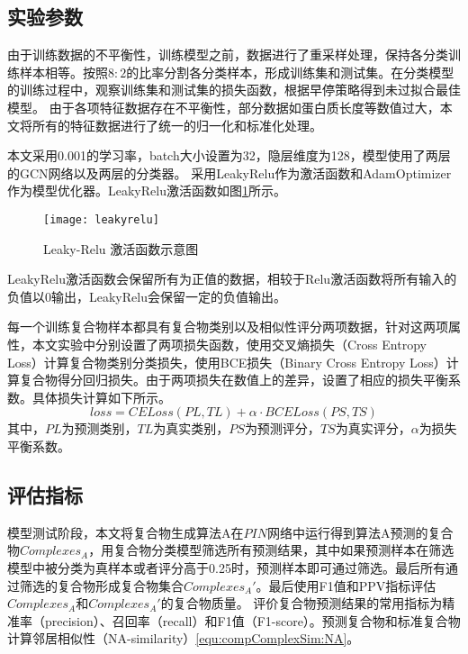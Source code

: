 \subsection{实验参数}
\label{subsection:allExperienceDesign:nums}

由于训练数据的不平衡性，训练模型之前，数据进行了重采样处理，保持各分类训练样本相等。按照$8:2$的比率分割各分类样本，形成训练集和测试集。在分类模型的训练过程中，观察训练集和测试集的损失函数，根据早停策略得到未过拟合最佳模型。
由于各项特征数据存在不平衡性，部分数据如蛋白质长度等数值过大，本文将所有的特征数据进行了统一的归一化和标准化处理。

本文采用0.001的学习率，batch大小设置为32，隐层维度为128，模型使用了两层的GCN网络以及两层的分类器。
采用LeakyRelu作为激活函数和AdamOptimizer作为模型优化器。LeakyRelu激活函数如图\ref{fig:leakyrelu}所示。

\begin{figure}[htbp]
    \centering
    \texttt{[image: leakyrelu]}
    \caption{Leaky-Relu 激活函数示意图}
    \label{fig:leakyrelu}
\end{figure}
LeakyRelu激活函数会保留所有为正值的数据，相较于Relu激活函数将所有输入的负值以0输出，LeakyRelu会保留一定的负值输出。


每一个训练复合物样本都具有复合物类别以及相似性评分两项数据，针对这两项属性，本文实验中分别设置了两项损失函数，使用交叉熵损失（Cross Entropy Loss）计算复合物类别分类损失，使用BCE损失（Binary Cross Entropy Loss）计算复合物得分回归损失。由于两项损失在数值上的差异，设置了相应的损失平衡系数。具体损失计算如下所示。
\begin{equation}
    \label{equ:loss}
    loss=CELoss(PL,TL)+\alpha \cdot BCELoss(PS,TS)
\end{equation}
其中，$PL$为预测类别，$TL$为真实类别，$PS$为预测评分，$TS$为真实评分，$\alpha$为损失平衡系数。

\subsection{评估指标}
\label{subsection:allExperienceDesign:metrix}

模型测试阶段，本文将复合物生成算法A在$PIN$网络中运行得到算法A预测的复合物$Complexes_A$，用复合物分类模型筛选所有预测结果，其中如果预测样本在筛选模型中被分类为真样本或者评分高于0.25时，预测样本即可通过筛选。最后所有通过筛选的复合物形成复合物集合$Complexes_A'$。最后使用F1值和PPV指标评估$Complexes_A$和$Complexes_A'$的复合物质量。
评价复合物预测结果的常用指标为精准率（precision）、召回率（recall）和F1值（F1-score）。预测复合物和标准复合物计算邻居相似性（NA-similarity）\ref{equ:compComplexSim:NA}。

